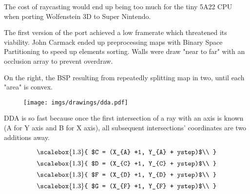 \begin{wrapfigure}[14]{r}{0.45\textwidth} 
\vspace{-10pt}
\end{wrapfigure} 
 The cost of raycasting would end up being too much for the tiny 5A22 CPU when porting Wolfenstein 3D to Super Nintendo.\\
\par
 The first version of the port achieved a low framerate which threatened its viability. John Carmack ended up preprocessing maps with Binary Space Partitioning to speed up elements sorting. Walls were draw "near to far" with an occlusion array to prevent overdraw.\\
 \par
 On the right, the BSP resulting from repeatedly splitting map  in two, until each "area" is convex.

 




\begin{figure}[H]
  \centering
 \texttt{[image: imgs/drawings/dda.pdf]}
\end{figure}
\par


DDA is so fast because once the first intersection of a ray with an axis is known (A for Y axis and B for X axis), all subsequent intersections' coordinates are two additions away.
\par


\begin{equation*}
    \scalebox{1.3}{
$C = (X_{A} +1, Y_{A} + ystep)$\\
}
\end{equation*}
\begin{equation*}
    \scalebox{1.3}{
$D = (X_{C} +1, Y_{C} + ystep)$\\
}
\end{equation*}
\begin{equation*}
    \scalebox{1.3}{
$F = (X_{D} +1, Y_{D} + ystep)$\\
}
\end{equation*}
\begin{equation*}
    \scalebox{1.3}{
$G = (X_{F} +1, Y_{F} + ystep)$\\
}
\end{equation*}


